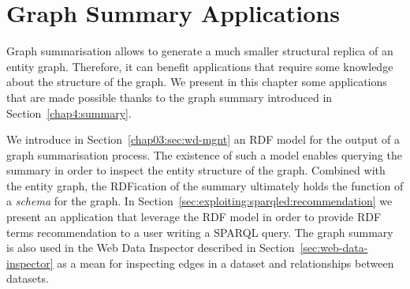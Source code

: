 \chapter{Graph Summary Applications}
\label{chap:system}

Graph summarisation allows to generate a much smaller structural replica of an entity graph. Therefore, it can benefit applications that require some knowledge about the structure of the graph. We present in this chapter some applications that are made possible thanks to the graph summary introduced in Section~\ref{chap4:summary}.

We introduce in Section~\ref{chap03:sec:wd-mgnt} an RDF model for the output of a graph summarisation process. The existence of such a model enables querying the summary in order to inspect the entity structure of the graph. Combined with the entity graph, the RDFication of the summary ultimately holds the function of a \emph{schema} for the graph. In Section~\ref{sec:exploiting:sparqled:recommendation} we present an application that leverage the RDF model in order to provide RDF terms recommendation to a user writing a SPARQL query. The graph summary is also used in the Web Data Inspector described in Section~\ref{sec:web-data-inspector} as a mean for inspecting edges in a dataset and relationships between datasets.
